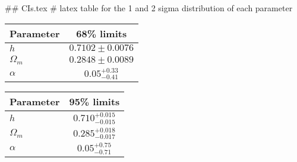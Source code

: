 ## CIs.tex
# latex table for the 1 and 2 sigma distribution of each parameter

\begin{tabular} { l  c}
 Parameter &  68\% limits\\
\hline
{\boldmath$h              $} & $0.7102\pm 0.0076          $\\
{\boldmath$\Omega_m       $} & $0.2848\pm 0.0089          $\\
{\boldmath$\alpha         $} & $0.05^{+0.33}_{-0.41}      $\\
\hline
\end{tabular}

\begin{tabular} { l  c}
 Parameter &  95\% limits\\
\hline
{\boldmath$h              $} & $0.710^{+0.015}_{-0.015}   $\\
{\boldmath$\Omega_m       $} & $0.285^{+0.018}_{-0.017}   $\\
{\boldmath$\alpha         $} & $0.05^{+0.75}_{-0.71}      $\\
\hline
\end{tabular}
